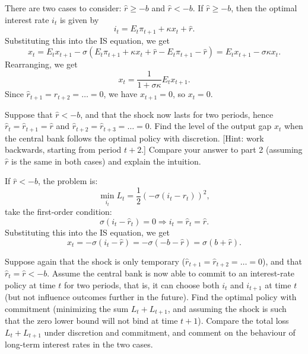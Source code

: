 \begin{solution}
    There are two cases to consider: $\hat{r} \geq -b$ and $\hat{r} < -b$.
    If $\hat{r} \geq -b$, then the optimal interest rate $i_t$ is given by
    \[
    i_t = E_t \pi_{t+1} + \kappa x_t + \hat{r}.
    \]
    Substituting this into the IS equation, we get
    \[
    x_t = E_t x_{t+1} - \sigma(E_t \pi_{t+1} + \kappa x_t + \hat{r} - E_t \pi_{t+1} - \hat{r}) = E_t x_{t+1} - \sigma \kappa x_t.
    \]
    Rearranging, we get
    \[
    x_t = \frac{1}{1 + \sigma \kappa} E_t x_{t+1}.
    \]
    Since $\hat{r}_{t+1} = \hat{r}_{t+2} = \ldots = 0$, we have $x_{t+1} = 0$, so $x_t = 0$.
\end{solution}

\begin{problem*}[3]
Suppose that $\hat{r} < -b$, and that the shock now lasts for two periods, hence $\hat{r}_t = \hat{r}_{t+1} = \hat{r}$ and $\hat{r}_{t+2} = \hat{r}_{t+3} = \ldots = 0$.
Find the level of the output gap $x_t$ when the central bank follows the optimal policy with discretion. [Hint: work backwards, starting from period $t + 2$.] Compare your answer to part 2 (assuming $\hat{r}$ is the same in both cases) and explain the intuition.
\end{problem*}

\begin{solution}
    If $\hat{r} < -b$, the problem is:
    \[
    \min_{i_t} L_t = \frac{1}{2} \left(-\sigma(i_t - r_t)\right)^2,
    \]
    take the first-order condition:
    \[
    \sigma(i_t - \hat{r}_t) = 0 \Rightarrow i_t = \hat{r}_t = \hat{r}.
    \]
    Substituting this into the IS equation, we get
    \[
    x_t = -\sigma (i_t - \hat{r}) = -\sigma (-b-\hat{r}) = \sigma (b+\hat{r}).
    \]
\end{solution}

\begin{problem*}[4]
Suppose again that the shock is only temporary ($\hat{r}_{t+1} = \hat{r}_{t+2} = \ldots = 0$), 
and that $\hat{r}_t = \hat{r} < -b$.
Assume the central bank is now able to commit to an interest-rate policy at time $t$ for two periods, 
that is, it can choose both $i_t$ and $i_{t+1}$ at time $t$ (but not influence outcomes further in the future). Find the optimal policy with commitment (minimizing the sum $L_t + L_{t+1}$, and assuming the shock is such that the zero lower bound will not bind at time $t + 1$). Compare the total loss $L_t + L_{t+1}$ under discretion and commitment, and comment on the behaviour of long-term interest rates in the two cases.
\end{problem*}

